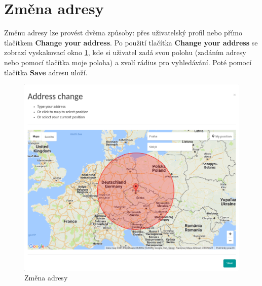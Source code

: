\section{Změna adresy}

\label{nur:address-change}

Změnu adresy lze provést dvěma způsoby: přes uživatelský profil nebo přímo tlačítkem \textbf{Change your address}. Po použití tlačítka \textbf{Change your address} se zobrazí vyskakovací okno \ref{fig:tur:address-change}, kde si uživatel zadá svou polohu (zadáním adresy nebo pomocí tlačítka moje poloha) a zvolí rádius pro vyhledávání. Poté pomocí tlačítka \textbf{Save} adresu uloží.

\begin{figure}[h]
    \centering
    \includegraphics[width=1.0\textwidth]{media/tur/address-change.png}
    \caption{Změna adresy}
    \label{fig:tur:address-change}
\end{figure}